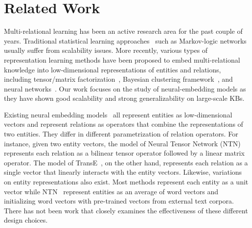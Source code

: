\documentclass{article} \usepackage{iclr2015,times}
\begin{document}
\section{Related Work}
\label{sec:related_work}
Multi-relational learning has been an active research area for the past couple of years. Traditional statistical learning approaches~\citep{GetoorTa07} such as Markov-logic networks~\citep{richardson2006markov} usually suffer from scalability issues. More recently, various types of representation learning methods have been proposed to embed multi-relational knowledge into low-dimensional representations of entities and relations, including tensor/matrix factorization~\citep{singh2008relational,NickelTrKr11,nickel2012factorizing}, Bayesian clustering framework~\citep{kemp2006learning, sutskever2009modelling}, and neural networks~\citep{paccanaro2001learning,bordes2013energy,BordesUsGaWeYa2013,SocherChenManningNg2013}. Our work focuses on the study of neural-embedding models as they have shown good scalability and strong generalizability on large-scale KBs.

Existing neural embedding models~\citep{bordes2013energy,BordesUsGaWeYa2013,SocherChenManningNg2013} all represent entities as low-dimensional vectors and represent relations as operators that combine the representations of two entities. They differ in different parametrization of relation operators. For instance, given two entity vectors, the model of Neural Tensor Network (NTN)~\citep{SocherChenManningNg2013} represents each relation as a bilinear tensor operator followed by a linear matrix operator. The model of TransE~\citep{BordesUsGaWeYa2013}, on the other hand, represents each relation as a single vector that linearly interacts with the entity vectors. Likewise, variations on entity representations also exist. Most methods represent each entity as a unit vector while NTN~\citep{SocherChenManningNg2013} represent entities as an average of word vectors and initializing word vectors with pre-trained vectors from external text corpora. There has not been work that closely examines the effectiveness of these different design choices. 
\end{document}
